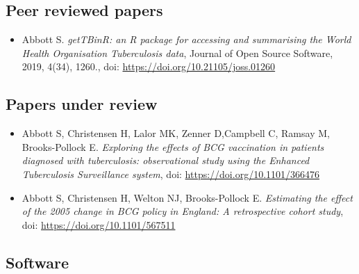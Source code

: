 \documentclass[11pt,twoside]{bristolthesis}
\providecommand{\tightlist}{%
  \setlength{\itemsep}{0pt}\setlength{\parskip}{0pt}}
\begin{document}
  \hypertarget{peer-reviewed-papers}{%
  \subsection{Peer reviewed papers}\label{peer-reviewed-papers}}
  \begin{itemize}
  \tightlist
  \item
    Abbott S. \emph{getTBinR: an R package for accessing and summarising the World Health Organisation Tuberculosis data},
    Journal of Open Source Software, 2019, 4(34), 1260., doi: \url{https://doi.org/10.21105/joss.01260}
  \end{itemize}
  \hypertarget{papers-under-review}{%
  \subsection{Papers under review}\label{papers-under-review}}
  \begin{itemize}
  \item
    Abbott S, Christensen H, Lalor MK, Zenner D,Campbell C, Ramsay M, Brooks-Pollock E. \emph{Exploring the effects of BCG vaccination in patients diagnosed with tuberculosis: observational study using the Enhanced Tuberculosis Surveillance system}, doi: \url{https://doi.org/10.1101/366476}
  \item
    Abbott S, Christensen H, Welton NJ, Brooks-Pollock E. \emph{Estimating the effect of the 2005 change in BCG policy in England: A retrospective cohort study}, doi: \url{https://doi.org/10.1101/567511}
  \end{itemize}
  \hypertarget{software}{%
  \subsection{Software}\label{software}}
  
\end{document}
